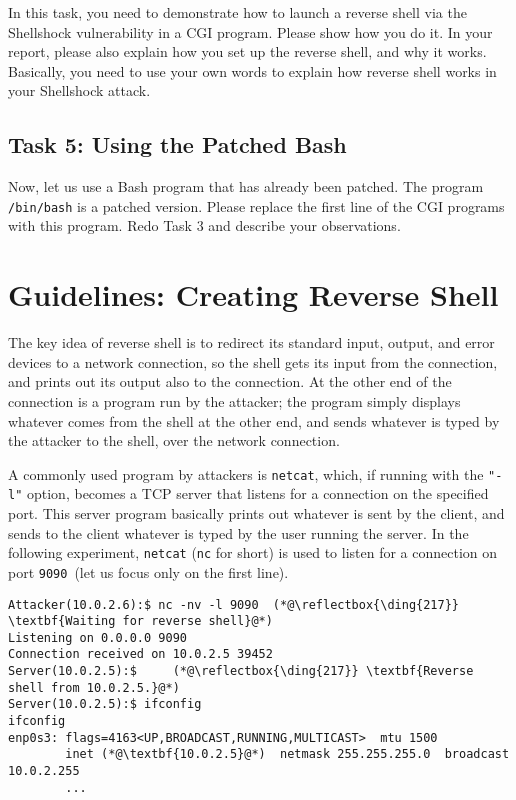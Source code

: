 In this task, you need to demonstrate 
how to launch a reverse shell via the Shellshock vulnerability in a CGI program. 
Please show how you do it. In your report, please also explain 
how you set up the reverse shell, and why it works. Basically, you need to
use your own words to explain how reverse shell works in your Shellshock
attack. 


\subsection{Task 5: Using the Patched Bash}

Now, let us use a Bash program that has already been patched.
The program \texttt{/bin/bash} is a patched version.
Please replace the first line of 
the CGI programs with this program. 
Redo Task 3 and describe your observations. 


\section{Guidelines: Creating Reverse Shell}
\label{shellshock:sec:reverseshell}


The key idea of reverse shell is to redirect its standard input, output, and error devices to a
network connection, so the shell gets its input from the connection, and prints out its output
also to the connection. At the other end of the connection is a program run by the
attacker; the program simply displays whatever comes from the shell at the other end,
and sends whatever is typed by the attacker to the shell, over the network connection.

A commonly used program by attackers is
\texttt{netcat}, which, if running
with the \texttt{"-l"} option, becomes a TCP server that listens for a connection on the
specified port. This server program basically prints out whatever is sent by the client, and
sends to the client whatever is typed by the user running the server.
In the following experiment, \texttt{netcat} (\texttt{nc} for short) is used
to listen for a connection on port \texttt{9090}~(let us focus only on the first line).


\begin{lstlisting}
Attacker(10.0.2.6):$ nc -nv -l 9090  (*@\reflectbox{\ding{217}} \textbf{Waiting for reverse shell}@*)
Listening on 0.0.0.0 9090
Connection received on 10.0.2.5 39452
Server(10.0.2.5):$     (*@\reflectbox{\ding{217}} \textbf{Reverse shell from 10.0.2.5.}@*)
Server(10.0.2.5):$ ifconfig
ifconfig
enp0s3: flags=4163<UP,BROADCAST,RUNNING,MULTICAST>  mtu 1500
        inet (*@\textbf{10.0.2.5}@*)  netmask 255.255.255.0  broadcast 10.0.2.255
        ...
\end{lstlisting}


